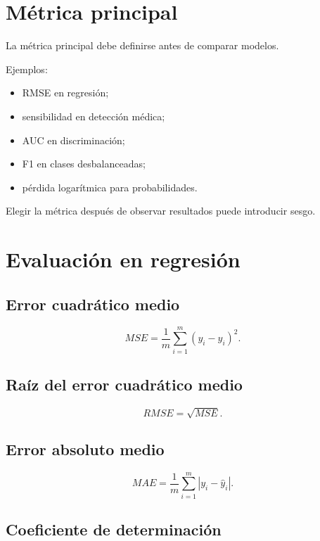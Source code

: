 \documentclass[
  spanish,
  11pt,
  letterpaper,
  DIV=11,
  numbers=noendperiod]{scrreprt}
\providecommand{\tightlist}{%
  \setlength{\itemsep}{0pt}\setlength{\parskip}{0pt}}
\theoremstyle{definition}
\theoremstyle{plain}
\theoremstyle{definition}
\theoremstyle{remark}
\begin{document}
\section{Métrica principal}\label{muxe9trica-principal}

La métrica principal debe definirse antes de comparar modelos.

Ejemplos:

\begin{itemize}
\tightlist
\item
  RMSE en regresión;
\item
  sensibilidad en detección médica;
\item
  AUC en discriminación;
\item
  F1 en clases desbalanceadas;
\item
  pérdida logarítmica para probabilidades.
\end{itemize}

Elegir la métrica después de observar resultados puede introducir sesgo.

\section{Evaluación en regresión}\label{evaluaciuxf3n-en-regresiuxf3n}

\subsection{Error cuadrático medio}\label{error-cuadruxe1tico-medio-1}

\[
MSE
=
\frac{1}{m}
\sum_{i=1}^{m}
(
y_i-\widehat{y}_i
)^2.
\]

\subsection{Raíz del error cuadrático
medio}\label{rauxedz-del-error-cuadruxe1tico-medio}

\[
RMSE
=
\sqrt{MSE}.
\]

\subsection{Error absoluto medio}\label{error-absoluto-medio}

\[
MAE
=
\frac{1}{m}
\sum_{i=1}^{m}
|y_i-\widehat{y}_i|.
\]

\subsection{Coeficiente de
determinación}\label{coeficiente-de-determinaciuxf3n}
\end{document}
